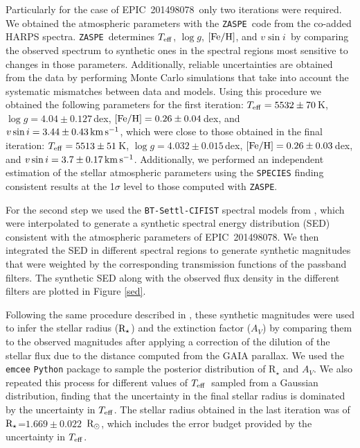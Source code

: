 \documentclass[useAMS,usenatbib]{mnras}
\newcommand{\feh}{\ensuremath{{\rm [Fe/H]}}}
\newcommand{\teff}{\ensuremath{T_{\rm eff}}}
\newcommand{\logg}{\ensuremath{\log{g}}}
\newcommand{\zaspe}{\texttt{ZASPE}}
\newcommand{\vsini}{\ensuremath{v \sin{i}}}
\newcommand{\kms}{\ensuremath{{\rm km\,s^{-1}}}}
\newcommand{\rstar}{\ensuremath{{\rm R}_{\star}}}
\newcommand{\rsun}{\ensuremath{{\rm R}_{\odot}}}
\newcommand{\rskep}{\ensuremath{1.669 \pm 0.022 }}
\newcommand{\stname}{EPIC~201498078}
\begin{document}
Particularly for the case of \stname\ only two iterations were required. We obtained the atmospheric parameters with the \zaspe\ code \citep{brahm:2015,brahm:2016:zaspe} from the co-added HARPS spectra.
\zaspe\ determines \teff, \logg, \feh, and \vsini\ by
comparing the observed spectrum to synthetic ones in the spectral regions most sensitive to changes in those parameters. Additionally, reliable uncertainties are obtained from the data by performing Monte Carlo simulations that take into account the systematic mismatches between data and models.
Using this procedure we obtained the following parameters for the first iteration:
 $\teff = 5532 \pm 70$\,K, $\logg = 4.04 \pm 0.127$\,dex, $\feh = 0.26 \pm 0.04$\,dex, and $\vsini = 3.44 \pm 0.43\,\kms$, which were close to
 those obtained in the final iteration: 
  $\teff = 5513 \pm 51$\,K, $\logg = 4.032 \pm 0.015$\,dex, $\feh = 0.26 \pm 0.03$\,dex, and $\vsini = 3.7 \pm 0.17\,\kms$. Additionally, we performed an independent estimation of the stellar atmospheric parameters using the \texttt{SPECIES} \citep{species} finding consistent results at the 1$\sigma$ level to those computed with \zaspe. 
  
For the second step we used the \texttt{BT-Settl-CIFIST} spectral models from \citet{baraffe:2015}, which were interpolated to generate a synthetic spectral energy distribution (SED) consistent with the atmospheric parameters of \stname.
We then integrated the SED in different spectral regions to generate synthetic magnitudes that were weighted by the corresponding
transmission functions of the passband filters. 
The synthetic SED along with the observed flux density  in the different filters are plotted in Figure \ref{sed}.

Following the same procedure described in \citet{k2-232}, these synthetic magnitudes were used to infer the stellar radius (\rstar) and the extinction factor ($A_V$) by comparing them to the observed
magnitudes after applying a correction of the dilution of the stellar flux due to the distance computed from the GAIA parallax. 
We used the \texttt{emcee} \texttt{Python} package \citep{emcee:2013} to sample the posterior distribution of  R$_{\star}$ and $A_V$.
We also repeated this process for different values of \teff\ sampled from a Gaussian distribution, finding that the uncertainty in the final stellar radius is dominated by the uncertainty in \teff.
The stellar radius obtained in the last iteration was of \rstar=\rskep\ \rsun, which includes the error budget provided by the uncertainty in \teff.
\end{document}
